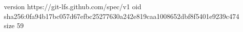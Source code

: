 version https://git-lfs.github.com/spec/v1
oid sha256:0fa94b17bc057d67efbc25277630a242e819caa1008652dbf8f5401e9239c474
size 59
